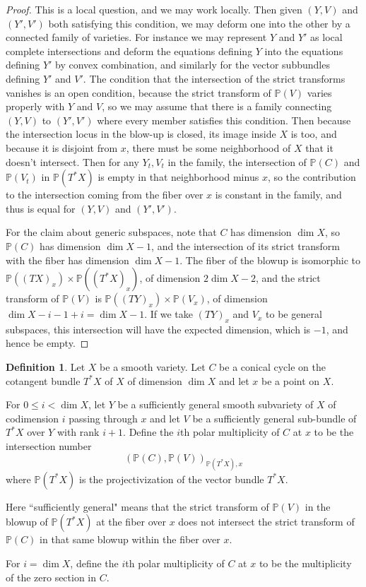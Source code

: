 \documentclass[12pt]{amsart}
\theoremstyle{definition}
\newtheorem{defi}[theorem]{Definition}
\theoremstyle{remark}
\begin{document}
\begin{proof} This is a local question, and we may work locally.  Then given $(Y,V)$ and $(Y',V')$ both satisfying this condition, we may deform one into the other by a connected family of varieties. For instance we may represent $Y$ and $Y'$ as local complete intersections and deform the equations defining $Y$ into the equations defining $Y'$ by convex combination, and similarly for the vector subbundles defining $Y'$ and $V'$. The condition that the intersection of the strict transforms vanishes is an open condition, because the strict transform of $\mathbb P(V)$ varies properly with $Y$ and $V$, so we may assume that there is a family connecting $(Y,V)$ to $(Y',V')$ where every member satisfies this condition. Then because the intersection locus in the blow-up is closed, its image inside $X$ is too, and because it is disjoint from $x$, there must be some neighborhood of $X$ that it doesn't intersect. Then for any $Y_t,V_t$ in the family, the intersection of $\mathbb P(C)$ and $\mathbb P(V_t)$ in $\mathbb P (T^* X)$ is empty in that neighborhood minus $x$, so the contribution to the intersection coming from the fiber over $x$ is constant in the family, and thus is equal for $(Y,V)$ and $(Y',V')$.

For the claim about generic subspaces, note that $C$ has dimension $\dim X$, so $\mathbb P(C)$ has dimension $\dim X-1$, and the intersection of its strict transform with the fiber has dimension $\dim X-1$.  The fiber of the blowup is isomorphic to $\mathbb P( (TX)_x ) \times \mathbb P( (T^*X)_x )$, of dimension $2 \dim X - 2$, and the strict transform of $\mathbb P(V)$ is $\mathbb P((TY)_x) \times \mathbb P ( V_x)$, of dimension $\dim X - i -1 + i = \dim X-1$. If we take $(TY)_x$ and $V_x$ to be general subspaces, this intersection will have the expected dimension, which is $-1$, and hence be empty. \end{proof}



\begin{defi}\label{polar-multiplicity-2} Let $X$ be a smooth variety. Let $C$ be a conical cycle on the cotangent bundle $T^* X$ of $X$ of dimension $\dim X$ and let $x$ be a point on $X$.

For $0 \leq i< \dim X$, let $Y$ be a sufficiently general smooth subvariety of $X$ of codimension $i$ passing through $x$ and let $V$ be a sufficiently general sub-bundle of $T^* X$ over $Y$ with rank $i+1$. Define the $i$th polar multiplicity of $C$ at $x$ to be the intersection number \[ ( \mathbb P(C) , \mathbb P(V))_{ \mathbb P(T^* X), x} \] where $\mathbb P(T^* X)$ is the projectivization of the vector bundle $T^* X$.

Here ``sufficiently general" means that the strict transform of $\mathbb P(V)$ in the blowup of $\mathbb P(T^* X)$ at the fiber over $x$ does not intersect the strict transform of $\mathbb P(C)$ in that same blowup within the fiber over $x$.

For $i=\dim X$, define the $i$th polar multiplicity of $C$ at $x$ to be the multiplicity of the zero section in $C$. \end{defi}
\end{document}
